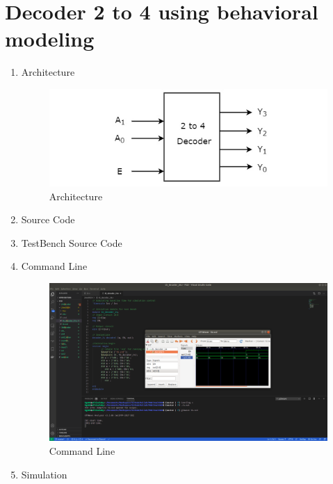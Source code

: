 \documentclass{class}
\begin{document}
\cover
\section{Decoder 2 to 4 using behavioral modeling}
    \begin{enumerate}
        \item Architecture
        \begin{figure}[H]
            \centering
            \includegraphics[width=1\linewidth]{gambar/2_to_4_decoder.jpg}
            \caption{Architecture}
            \label{Architecture}
            \end{figure}
        \item Source Code
                
        \item TestBench Source Code
        
        \item Command Line
        \begin{figure}[H]
            \centering
            \includegraphics[width=1\linewidth]{gambar/cmd.png}
            \caption{Command Line}
            \label{cmd}
            \end{figure}
        \item Simulation
        \begin{figure}[H]
            \centering

\end{figure}
\end{enumerate}
\end{document}
